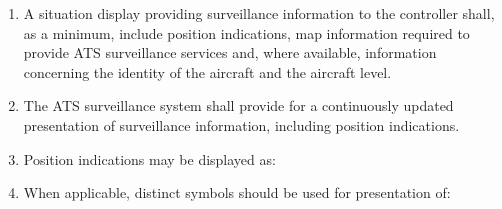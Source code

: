 \documentclass[../vATM.tex]{subfiles}
\begin{document}
    \begin{enumerate}[label=\arabic{section}.\arabic{subsection}.\arabic*]
        \item A situation display providing surveillance information to the controller shall, as a minimum, include position indications, map information required to provide ATS surveillance services and, where available, information concerning the identity of the aircraft and the aircraft level.
        \item The ATS surveillance system shall provide for a continuously updated presentation of surveillance information, including position indications.
        \item Position indications may be displayed as:


        \item When applicable, distinct symbols should be used for presentation of:



\end{enumerate}
\end{document}

